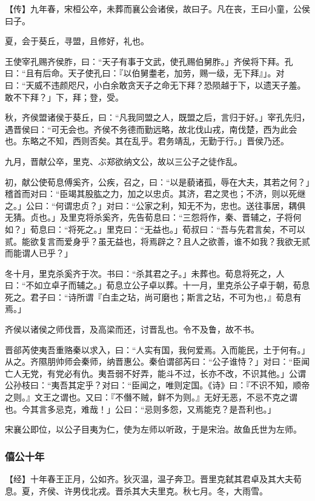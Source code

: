 \documentclass[]{article}
\begin{document}
【传】九年春，宋桓公卒，未葬而襄公会诸侯，故曰子。凡在丧，王曰小童，公侯曰子。

夏，会于葵丘，寻盟，且修好，礼也。

王使宰孔赐齐侯胙，曰：``天子有事于文武，使孔赐伯舅胙。」齐侯将下拜。孔曰：``且有后命。天子使孔曰：『以伯舅耋老，加劳，赐一级，无下拜』」。对曰：``天威不违颜咫尺，小白余敢贪天子之命无下拜？恐陨越于下，以遗天子羞。敢不下拜？」下，拜；登，受。

秋，齐侯盟诸侯于葵丘，曰：``凡我同盟之人，既盟之后，言归于好。」宰孔先归，遇晋侯曰：``可无会也。齐侯不务德而勤远略，故北伐山戎，南伐楚，西为此会也。东略之不知，西则否矣。其在乱乎。君务靖乱，无勤于行。」晋侯乃还。

九月，晋献公卒，里克、ぶ郑欲纳文公，故以三公子之徒作乱。

初，献公使荀息傅奚齐，公疾，召之，曰：``以是藐诸孤，辱在大夫，其若之何？」稽首而对曰：``臣竭其股肱之力，加之以忠贞。其济，君之灵也；不济，则以死继之。」公曰：``何谓忠贞？」对曰：``公家之利，知无不为，忠也。送往事居，耦俱无猜。贞也。」及里克将杀奚齐，先告荀息曰：``三怨将作，秦、晋辅之，子将何如？」荀息曰：``将死之。」里克曰：``无益也。」荀叔曰：``吾与先君言矣，不可以贰。能欲复言而爱身乎？虽无益也，将焉辟之？且人之欲善，谁不如我？我欲无贰而能谓人已乎？」

冬十月，里克杀奚齐于次。书曰：``杀其君之子。」未葬也。荀息将死之，人曰：``不如立卓子而辅之。」荀息立公子卓以葬。十一月，里克杀公子卓于朝，荀息死之。君子曰：``诗所谓『白圭之玷，尚可磨也；斯言之玷，不可为也，』荀息有焉。」

齐侯以诸侯之师伐晋，及高梁而还，讨晋乱也。令不及鲁，故不书。

晋郤芮使夷吾重赂秦以求入，曰：``人实有国，我何爱焉。入而能民，土于何有。」从之。齐隰朋帅师会秦师，纳晋惠公。秦伯谓郤芮曰：``公子谁恃？」对曰：``臣闻亡人无党，有党必有仇。夷吾弱不好弄，能斗不过，长亦不改，不识其他。」公谓公孙枝曰：``夷吾其定乎？对曰：``臣闻之，唯则定国。《诗》曰：『不识不知，顺帝之则。』文王之谓也。又曰：『不僭不贼，鲜不为则。』无好无恶，不忌不克之谓也。今其言多忌克，难哉！」公曰：``忌则多怨，又焉能克？是吾利也。」

宋襄公即位，以公子目夷为仁，使为左师以听政，于是宋治。故鱼氏世为左师。

\hypertarget{header-n753}{%
\subsubsection{僖公十年}\label{header-n753}}

【经】十年春王正月，公如齐。狄灭温，温子奔卫。晋里克弑其君卓及其大夫荀息。夏，齐侯、许男伐北戎。晋杀其大夫里克。秋七月。冬，大雨雪。
\end{document}
